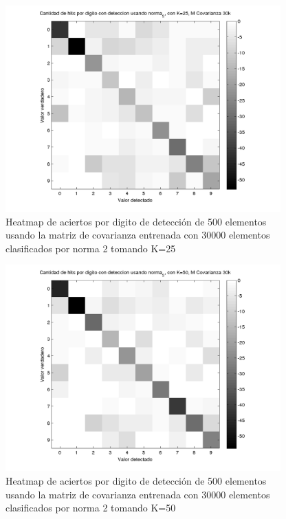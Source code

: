 \begin{figure}[H]
\includegraphics[width=300pt]{plots/heatmap-30kcv-k25-norma_2.png}
\caption{Heatmap de aciertos por digito de detecci\'on de 500 elementos usando la matriz de covarianza entrenada con 30000 elementos
clasificados por norma 2 tomando K=25 }
\label{fig:HM30kcv-k25}
\end{figure}

\begin{figure}[H]
\includegraphics[width=300pt]{plots/heatmap-30kcv-k50-norma_2.png}
\caption{Heatmap de aciertos por digito de detecci\'on de 500 elementos usando la matriz de covarianza entrenada con 30000 elementos
clasificados por norma 2 tomando K=50 }
\label{fig:HM30kcv-k50}
\end{figure}